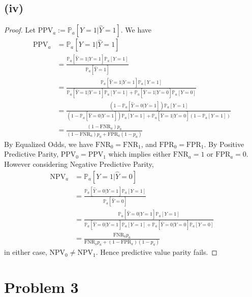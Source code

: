 \documentclass[twoside,11pt]{homework}
\begin{document}
 \subsection*{(iv)}
 	\begin{proof}
 		Let $\text{PPV}_a := \mathbb{P}_a[Y=1 | \hat{Y}=1]$. We have
 		\begin{align*}
 			\text{PPV}_a & = \mathbb{P}_a[Y=1 | \hat{Y}=1] \\
 			&= \frac{\mathbb{P}_a[\hat{Y}=1|Y=1] \mathbb{P}_a[Y=1] }
 			{\mathbb{P}_a[\hat{Y}=1] } \tag{Bayes Rule}\\
 			&= \frac{\mathbb{P}_a[\hat{Y}=1|Y=1] \mathbb{P}_a[Y=1] }
 			{\mathbb{P}_a[\hat{Y}=1|Y=1] \mathbb{P}_a[Y=1]+
 			\mathbb{P}_a[\hat{Y}=1|Y=0] \mathbb{P}_a[Y=0] }\\
 			&= \frac{ (1-\mathbb{P}_a[\hat{Y}=0|Y=1]) \mathbb{P}_a[Y=1] }
 			{ (1-\mathbb{P}_a[\hat{Y}=0|Y=1])  \mathbb{P}_a[Y=1]+
 			\mathbb{P}_a[\hat{Y}=1|Y=0] (1-\mathbb{P}_a[Y=1]) }\\
 			&= \frac{(1-\text{FNR}_a) p_a}{(1-\text{FNR}_a)  p_a+\text{FPR}_a(1-p_a)}
 		\end{align*}
 		By Equalized Odds, we have $\text{FNR}_0=\text{FNR}_1$, and $\text{FPR}_0=\text{FPR}_1$.
 		By Positive Predictive Parity, $\text{PPV}_0=\text{PPV}_1$ which implies either $\text{FNR}_a=1$
 		or $\text{FPR}_a=0$. However considering Negative Predictive Parity,
 		\begin{align*}
 			\text{NPV}_a &=  \mathbb{P}_a[Y=1 | \hat{Y}=0] \\
 			&= \frac{\mathbb{P}_a[\hat{Y}=0|Y=1] \mathbb{P}_a[Y=1] }
 			{\mathbb{P}_a[\hat{Y}=0] } \tag{Bayes Rule}\\
 			&= \frac{\mathbb{P}_a[\hat{Y}=0|Y=1] \mathbb{P}_a[Y=1] }
 			{\mathbb{P}_a[\hat{Y}=0|Y=1] \mathbb{P}_a[Y=1]+
 			\mathbb{P}_a[\hat{Y}=0|Y=0] \mathbb{P}_a[Y=0] }\\
 			&= \frac{\text{FNR}_a p_a}{\text{FNR}_a p_a+(1-\text{FPR}_a)(1-p_a)}
 		\end{align*}
 		in either case, $\text{NPV}_0\neq \text{NPV}_1$. Hence predictive value parity fails.
 	\end{proof}

 \section*{Problem 3}
\end{document}
